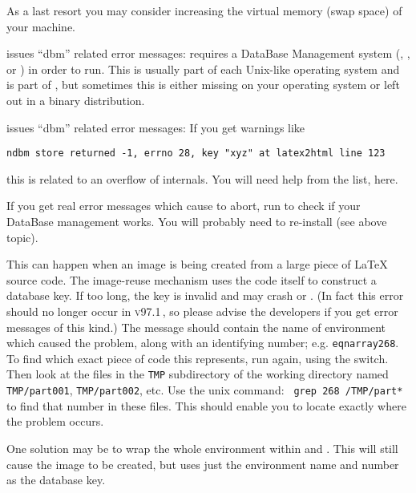 \begin{htmllist}
As a last resort you may consider increasing the virtual memory
(swap space) of your machine.


\item [\fn{install-test} issues ``dbm'' related error messages: ]\latex{~\\}%
\latextohtml{} requires a DataBase Management system (,
, or ) in order to run.
This is usually part of each Unix-like operating system and
 is part of , but sometimes this is either missing
on your operating system or left out in a binary \Perl{} distribution.

\item [\fn{latex2html} issues ``dbm'' related error messages: ]
If you get warnings like
\begin{verbatim}
ndbm store returned -1, errno 28, key "xyz" at latex2html line 123
\end{verbatim}
this is related to an overflow of \latextohtml{} internals.
You will need help from the list, here.
\smallskip

If you get real error messages which cause \latextohtml{} to abort,
run  to check if your DataBase management works.
You will probably need to re-install  (see above topic).


This can happen when an image is being created from a large piece
of \LaTeX{} source code. The image-reuse mechanism uses the code itself
to construct a database key. If too long, the key is invalid and may
crash  or . (In fact this error should no longer
occur in \textsc{v97.1}\,, so please advise the \latextohtml{} developers if
you get error messages of this kind.)\html{\\}
The message should contain the name of environment which caused the problem,
along with an identifying number; e.g. \texttt{eqnarray268}.
To find which exact piece of code this represents, run \latextohtml{}
again, using the  switch. Then look at the files
in the \texttt{TMP} subdirectory of the working directory
named \texttt{TMP/part001}, \texttt{TMP/part002}, etc.
Use the unix  command: \texttt{ grep 268 }\texttt{/TMP/part* }
to find that number in these files. 
This should enable you to locate exactly where the problem occurs.

One solution may be to wrap the whole environment within
 and .
This will still cause the image to be created, 
but uses just the environment name and number as the database key.




\end{htmllist}
